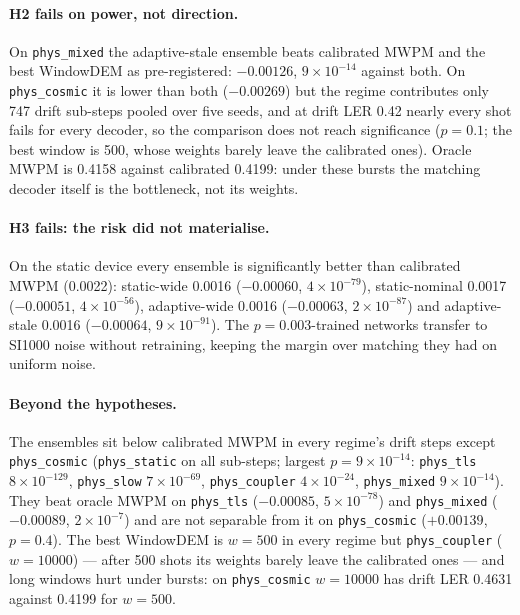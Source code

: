 \documentclass[11pt,a4paper]{article}
\newcommand{\reg}[1]{\texttt{#1}}
\newcommand{\E}[2]{${#1}{\times}10^{-#2}$}  %
\newcommand{\Eb}[2]{{#1}{\times}10^{-#2}}   %
\begin{document}
\paragraph{H2 fails on power, not direction.}
On \reg{phys\_mixed} the adaptive-stale ensemble beats calibrated MWPM and the best WindowDEM as
pre-registered: $-0.00126$, \E{9}{14} against both. On \reg{phys\_cosmic} it is lower than both
($-0.00269$) but the regime contributes only 747 drift sub-steps pooled over five seeds, and at drift LER
0.42 nearly every shot fails for every decoder, so the comparison does not reach significance ($p=0.1$; the
best window is 500, whose weights barely leave the calibrated ones). Oracle MWPM is 0.4158 against
calibrated 0.4199: under these bursts the matching decoder itself is the bottleneck, not its weights.

\paragraph{H3 fails: the risk did not materialise.}
On the static device every ensemble is significantly better than calibrated MWPM (0.0022): static-wide
0.0016 ($-0.00060$, \E{4}{79}), static-nominal 0.0017 ($-0.00051$, \E{4}{56}), adaptive-wide
0.0016 ($-0.00063$, \E{2}{87}) and adaptive-stale 0.0016 ($-0.00064$, \E{9}{91}). The $p=0.003$-trained
networks transfer to SI1000 noise without retraining, keeping the margin over matching they had on
uniform noise.

\paragraph{Beyond the hypotheses.}
The ensembles sit below calibrated MWPM in every regime's drift steps except \reg{phys\_cosmic}
(\reg{phys\_static} on all sub-steps; largest $p=\Eb{9}{14}$: \reg{phys\_tls} \E{8}{129}, \reg{phys\_slow}
\E{7}{69}, \reg{phys\_coupler} \E{4}{24}, \reg{phys\_mixed} \E{9}{14}). They beat oracle MWPM on
\reg{phys\_tls} ($-0.00085$, \E{5}{78}) and \reg{phys\_mixed} ($-0.00089$, \E{2}{7}) and are not separable
from it on \reg{phys\_cosmic} ($+0.00139$, $p=0.4$). The best WindowDEM is $w=500$ in every regime but
\reg{phys\_coupler} ($w=10000$) --- after 500 shots its weights barely leave the calibrated ones --- and
long windows hurt under bursts: on \reg{phys\_cosmic} $w=10000$ has drift LER 0.4631 against 0.4199 for
$w=500$.
\end{document}
